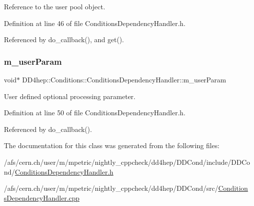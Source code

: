 Reference to the user pool object. 



Definition at line 46 of file Conditions\+Dependency\+Handler.\+h.



Referenced by do\+\_\+callback(), and get().

\hypertarget{class_d_d4hep_1_1_conditions_1_1_conditions_dependency_handler_a0566a51b0e547abb517f162cf90a6db0}{}\label{class_d_d4hep_1_1_conditions_1_1_conditions_dependency_handler_a0566a51b0e547abb517f162cf90a6db0} 
\subsubsection{\texorpdfstring{m\+\_\+user\+Param}{m\_userParam}}
{\footnotesize\ttfamily void$\ast$ D\+D4hep\+::\+Conditions\+::\+Conditions\+Dependency\+Handler\+::m\+\_\+user\+Param\hspace{0.3cm}{\ttfamily [protected]}}



User defined optional processing parameter. 



Definition at line 50 of file Conditions\+Dependency\+Handler.\+h.



Referenced by do\+\_\+callback().



The documentation for this class was generated from the following files\+:\begin{DoxyCompactItemize}
\item 
/afs/cern.\+ch/user/m/mpetric/nightly\+\_\+cppcheck/dd4hep/\+D\+D\+Cond/include/\+D\+D\+Cond/\hyperlink{_conditions_dependency_handler_8h}{Conditions\+Dependency\+Handler.\+h}\item 
/afs/cern.\+ch/user/m/mpetric/nightly\+\_\+cppcheck/dd4hep/\+D\+D\+Cond/src/\hyperlink{_conditions_dependency_handler_8cpp}{Conditions\+Dependency\+Handler.\+cpp}\end{DoxyCompactItemize}
